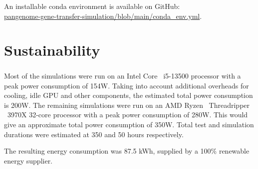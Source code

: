 An installable conda environment is available on GitHub:\\
\href{https://github.com/not-a-feature/pangenome-gene-transfer-simulation/blob/main/conda_env.yml}{pangenome-gene-transfer-simulation/blob/main/conda\_env.yml}.

\section{Sustainability}
Most of the simulations were run on an Intel \textsuperscript{\textregistered} Core \texttrademark ~i5-13500 processor with a peak power consumption of 154W.
Taking into account additional overheads for cooling, idle GPU and other components, the estimated total power consumption is 200W.
The remaining simulations were run on an AMD Ryzen \texttrademark ~Threadripper \texttrademark ~3970X 32-core processor with a peak power consumption of 280W.
This would give an approximate total power consumption of 350W.
Total test and simulation durations were estimated at 350 and 50 hours respectively.

The resulting energy consumption was 87.5 kWh, supplied by a 100\% renewable energy supplier.